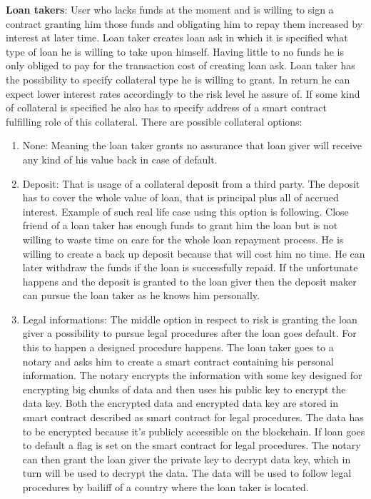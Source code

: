 \documentclass[a4paper,12pt,twoside,openany]{report}
\begin{document}
\textbf{Loan takers}: User who lacks funds at the moment and is willing to sign a contract granting him those funds and obligating him to repay them increased by interest at later time. Loan taker creates loan ask in which it is specified what type of loan he is willing to take upon himself. Having little to no funds he is only obliged to pay for the transaction cost of creating loan ask. Loan taker has the possibility to specify collateral type he is willing to grant. In return he can expect lower interest rates accordingly to the risk level he assure of. If some kind of collateral is specified he also has to specify address of a smart contract fulfilling role of this collateral. There are possible collateral options:
\begin{enumerate}
\item None: Meaning the loan taker grants no assurance that loan giver will receive any kind of his value back in case of default.
\item Deposit: That is usage of a collateral deposit from a third party. The deposit has to cover the whole value of loan, that is principal plus all of accrued interest. Example of such real life case using this option is following. Close friend of a loan taker has enough funds to grant him the loan but is not willing to waste time on care for the whole loan repayment process. He is willing to create a back up deposit because that will cost him no time. He can later withdraw the funds if the loan is successfully repaid. If the unfortunate happens and the deposit is granted to the loan giver then the deposit maker can pursue the loan taker as he knows him personally. 
\item Legal informations: The middle option in respect to risk is granting the loan giver a possibility to pursue legal procedures after the loan goes default. For this to happen a designed procedure happens. The loan taker goes to a notary and asks him to create a smart contract containing his personal information. The notary encrypts the information with some key designed for encrypting big chunks of data and then uses his public key to encrypt the data key. Both the encrypted data and encrypted data key are stored in smart contract described as smart contract for legal procedures. The data has to be encrypted because it's publicly accessible on the blockchain. If loan goes to default a flag is set on the smart contract for legal procedures. The notary can then grant the loan giver the private key to decrypt data key, which in turn will be used to decrypt the data. The data will be used to follow legal procedures by bailiff of a country where the loan taker is located.
\end{enumerate}
\end{document}
